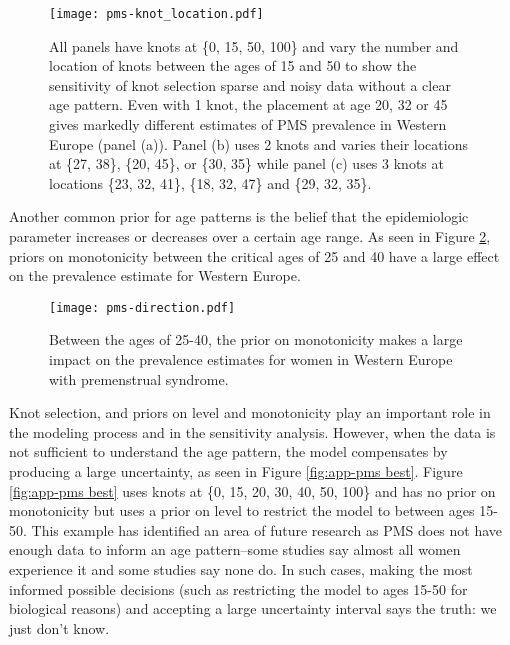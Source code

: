     \begin{figure}
        \begin{center}
            \texttt{[image: pms-knot\_location.pdf]}
        \end{center}
        \caption{All panels have knots at \{0, 15, 50, 100\} and vary
          the number and location of knots between the ages of 15 and
          50 to show the sensitivity of knot selection sparse and
          noisy data without a clear age pattern. Even with 1 knot,
          the placement at age 20, 32 or 45 gives markedly different
          estimates of PMS prevalence in Western Europe (panel (a)).
          Panel (b) uses 2 knots and varies their locations at \{27,
          38\}, \{20, 45\}, or \{30, 35\} while panel (c) uses 3 knots
          at locations \{23, 32, 41\}, \{18, 32, 47\} and \{29, 32,
          35\}.}
        \label{fig:app-pms knot_loc}
    \end{figure}

Another common prior for age patterns is the belief that the
epidemiologic parameter increases or decreases over a certain age
range.  As seen in Figure \ref{fig:app-pms dir}, priors on
monotonicity between the critical ages of 25 and 40 have a large
effect on the prevalence estimate for Western Europe.

    \begin{figure}
        \begin{center}
            \texttt{[image: pms-direction.pdf]}
        \end{center}
        \caption{Between the ages of 25-40, the prior on monotonicity
          makes a large impact on the prevalence estimates for women
          in Western Europe with premenstrual syndrome.}
        \label{fig:app-pms dir}
    \end{figure}

Knot selection, and priors on level and monotonicity play an important
role in the modeling process and in the sensitivity analysis.  However,
when the data is not sufficient to understand the age pattern, the
model compensates by producing a large uncertainty, as seen in
Figure \ref{fig:app-pms best}.  Figure \ref{fig:app-pms best} uses knots
at \{0, 15, 20, 30, 40, 50, 100\} and has no prior on monotonicity but
uses a prior on level to restrict the model to between ages 15-50.  This
example has identified an area of future research as PMS does not have enough
data to inform an age pattern--some studies say almost all women experience
it and some studies say none do.  In such cases, making the most informed
possible decisions (such as restricting the model to ages 15-50 for biological
reasons) and accepting a large uncertainty interval says the truth: we just don't know.

